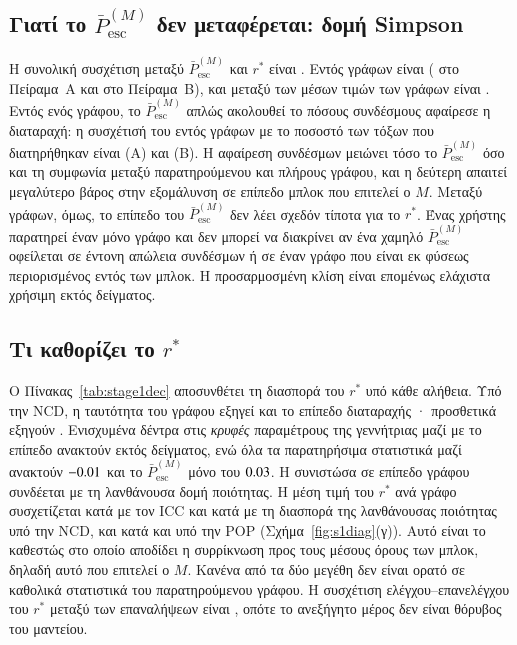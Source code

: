 \documentclass[11pt,a4paper]{article}
\theoremstyle{definition}
\theoremstyle{remark}
\newcommand{\Pbar}{\bar P^{(M)}_{\mathrm{esc}}}
\begin{document}
\subsection{Γιατί το \texorpdfstring{$\Pbar$}{P̄} δεν μεταφέρεται: δομή Simpson}
Η συνολική συσχέτιση μεταξύ $\Pbar$ και $r^*$ είναι \SOnePooled. Εντός γράφων είναι \SOneWithin{}
(\SOneWithinA{} στο Πείραμα~Α και \SOneWithinB{} στο Πείραμα~Β), και μεταξύ των μέσων τιμών των γράφων
είναι \SOneBetween. Εντός ενός γράφου, το $\Pbar$ απλώς ακολουθεί το πόσους συνδέσμους αφαίρεσε η
διαταραχή: η συσχέτισή του εντός γράφων με το ποσοστό των τόξων που διατηρήθηκαν είναι \SOnePkeepA{}
(Α) και \SOnePkeepB{} (Β). Η αφαίρεση συνδέσμων μειώνει τόσο το $\Pbar$ όσο και τη συμφωνία μεταξύ
παρατηρούμενου και πλήρους γράφου, και η δεύτερη απαιτεί μεγαλύτερο βάρος στην εξομάλυνση σε επίπεδο
μπλοκ που επιτελεί ο $M$. Μεταξύ γράφων, όμως, το επίπεδο του $\Pbar$ δεν λέει σχεδόν τίποτα για το
$r^*$. Ένας χρήστης παρατηρεί έναν μόνο γράφο και δεν μπορεί να διακρίνει αν ένα χαμηλό $\Pbar$
οφείλεται σε έντονη απώλεια συνδέσμων ή σε έναν γράφο που είναι εκ φύσεως περιορισμένος εντός των
μπλοκ. Η προσαρμοσμένη κλίση είναι επομένως ελάχιστα χρήσιμη εκτός δείγματος.

\subsection{Τι καθορίζει το \texorpdfstring{$r^*$}{r*}}
Ο Πίνακας~\ref{tab:stage1dec} αποσυνθέτει τη διασπορά του $r^*$ υπό κάθε αλήθεια. Υπό την NCD, η
ταυτότητα του γράφου εξηγεί \SOneDecBase{} και το επίπεδο διαταραχής \SOneDecLevel{}· προσθετικά
εξηγούν \SOneDecBL. Ενισχυμένα δέντρα στις \emph{κρυφές} παραμέτρους της γεννήτριας μαζί με το επίπεδο
ανακτούν \SOneDecHidden{} εκτός δείγματος, ενώ όλα τα παρατηρήσιμα στατιστικά μαζί ανακτούν
$-0.01$ και το $\Pbar$ μόνο του $0.03$. Η συνιστώσα σε επίπεδο γράφου συνδέεται με τη
λανθάνουσα δομή ποιότητας. Η μέση τιμή του $r^*$ ανά γράφο συσχετίζεται κατά \SOneCorrICC{} με τον ICC
και κατά \SOneCorrFit{} με τη διασπορά της λανθάνουσας ποιότητας υπό την NCD, και κατά
\SOneCorrICCPop{} και \SOneCorrFitPop{} υπό την POP (Σχήμα~\ref{fig:s1diag}(γ)). Αυτό είναι το
καθεστώς στο οποίο αποδίδει η συρρίκνωση προς τους μέσους όρους των μπλοκ, δηλαδή αυτό που επιτελεί ο
$M$. Κανένα από τα δύο μεγέθη δεν είναι ορατό σε καθολικά στατιστικά του παρατηρούμενου γράφου. Η
συσχέτιση ελέγχου--επανελέγχου του $r^*$ μεταξύ των επαναλήψεων είναι \SOneRetest, οπότε το ανεξήγητο
μέρος δεν είναι θόρυβος του μαντείου.
\end{document}

